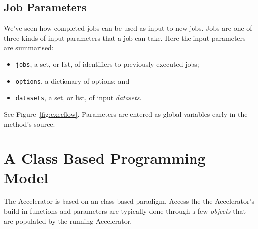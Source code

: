 \clearpage
\subsection{Job Parameters}
\label{sec:jobparams}
We've seen how completed jobs can be used as input to new
jobs.  Jobs are one of three kinds of input parameters that
a job can take.  Here the input parameters are summarised:
\begin{itemize}
\item[] \texttt{jobs}, a set, or list, of identifiers to previously executed jobs;
\item[] \texttt{options}, a dictionary of options; and
\item[] \texttt{datasets}, a set, or list, of input \textsl{datasets}.
\end{itemize}
See Figure~\ref{fig:execflow}.  Parameters are entered as global
variables early in the method's source.


\section{A Class Based Programming Model}
The Accelerator is based on an class based paradigm.  Access the the
Accelerator's build in functions and parameters are typically done
through a few \textsl{objects} that are populated by the running
Accelerator.
